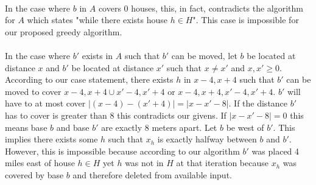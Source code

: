 \documentclass[10pt]{article}
\begin{document}
{  \paragraph{} In the case where $b$ in $A$ covers $0$ houses, this, in fact, contradicts the algorithm for $A$ which states 
  "while there exists house $h \in H$". This case is impossible for our proposed greedy algorithm. 

  \paragraph{} In the case where $b'$ exists in $A$ such that $b'$ can be moved, let $b$ be located at distance $x$ and $b'$ be located at distance $x'$ 
  such that $x \neq x'$ and $x, x' \geq 0$. According to our case statement, there exists $h$ in ${x - 4, x + 4}$ such that $b'$ can be moved to cover 
  ${x - 4, x + 4} \cup {x' - 4, x' + 4}$ or ${x - 4, x + 4, x' - 4, x' + 4}$. $b'$ will have to at most cover 
  $|(x - 4) - (x' + 4)| = |x - x' - 8|$.
  If the distance $b'$ has to cover is greater than 8 this contradicts our givens. If $|x - x' - 8| = 0$ this means base $b$ and base $b'$ are exactly 8 meters apart. Let $b$ be west of $b'$. 
  This implies there exists some $h$ such that $x_h$ is exactly halfway between $b$ and $b'$. However, this is impossible because according to our algorithm $b'$ was placed 4 miles east of house $h \in H$ yet
  $h$ was not in $H$ at that iteration because $x_h$ was covered by base $b$ and therefore deleted from available input. 
}


\newpage
\medskip{}

\end{document}
